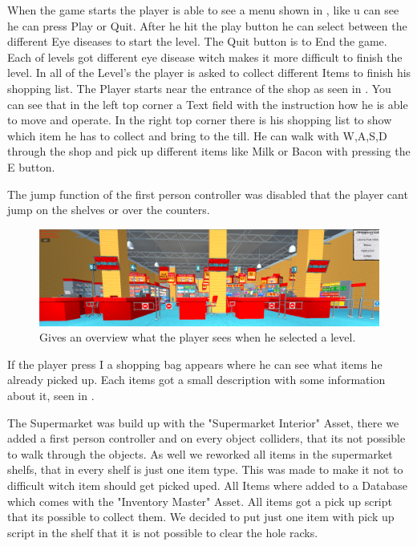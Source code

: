 \documentclass{sig-alternate-05-2015}
\begin{document}
When the game starts the player is able to see a menu shown in , like u can see he can press Play or Quit. After he hit the play button he can select between the different Eye diseases to start the level. The Quit button is to End the game. Each of levels got different eye disease witch makes it more difficult to finish the level. In all of the Level's the player is asked to collect different Items to finish his shopping list. The Player starts near the entrance of the shop as seen in . You can see that in the left top corner a Text field with the instruction how he is able to move and operate. In the right top corner there is his shopping list to show which item he has to collect and bring to the till. He can walk with W,A,S,D through the shop and pick up different items like Milk or Bacon with pressing the E button. 

The jump function of the first person controller was disabled that the player cant jump on the shelves or over the counters.

\begin{figure}
    \centering
    \includegraphics[width=\columnwidth]{Game.png}
    \caption{Gives an overview what the player sees when he selected a level.}
    \label{fig:gamestart}
\end{figure}

If the player press I a shopping bag appears where he can see what items he already picked up. Each items got a small description with some information about it, seen in . 

The Supermarket was build up with the "Supermarket Interior" Asset, there we added a first person controller and on every object colliders, that its not possible to walk through the objects. As well we reworked all items in the supermarket shelfs, that in every shelf is just one item type. This was made to make it not to difficult witch item should get picked uped. All Items where added to a Database which comes with the "Inventory Master" Asset. All items got a pick up script that its possible to collect them. We decided to put just one item with pick up script in the shelf that it is not possible to clear the hole racks.
\end{document}
